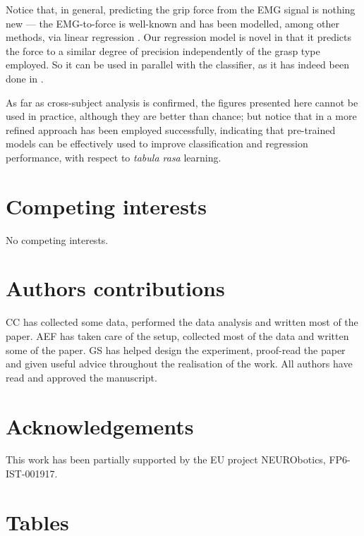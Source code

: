 \documentclass[10pt]{bmc_article}
\newenvironment{bmcformat}
  {\begin{raggedright}\baselineskip20pt\sloppy\setboolean{publ}{false}}
  {\end{raggedright}\baselineskip20pt\sloppy}
\begin{document}
\begin{bmcformat}
Notice that, in general, predicting the grip force from the EMG signal
is nothing new --- the EMG-to-force is well-known and has been modelled,
among other methods, via linear regression \cite{Hoozemans05}. Our regression model
is novel in that it predicts the force to a similar degree of precision
independently of the grasp type employed. So it can be used in parallel
with the classifier, as it has indeed been done in \cite{2008.BioCyb}.

As far as cross-subject analysis is confirmed, the figures presented here
cannot be used in practice, although they are better than chance; but notice
that in \cite{2009.ICRA} a more refined approach has been employed successfully,
indicating that pre-trained models can be effectively used to improve
classification and regression performance, with respect to \emph{tabula rasa}
learning.

\section*{Competing interests}

No competing interests.

\section*{Authors contributions}

CC has collected some data, performed the data analysis and written most of the
paper. AEF has taken care of the setup, collected most of the data and written
some of the paper. GS has helped design the experiment, proof-read the paper
and given useful advice throughout the realisation of the work. All authors
have read and approved the manuscript.

\section*{Acknowledgements}

This work has been partially supported by the EU project NEURObotics, FP6-IST-001917.

{
   }     %


\newpage
\section*{Tables}


\end{bmcformat}
\end{document}
